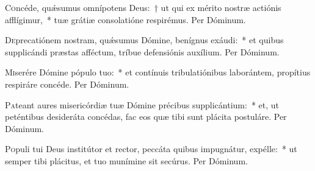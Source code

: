 \documentclass[vesperale_romanum.tex]{subfiles}
\begin{document}

\oratio

\lettrine{C}{o}ncéde, quǽsumus omnípotens Deus:~† ut qui ex mérito nostræ actiónis afflígimur,~* tuæ grátiæ consolatióne respirémus.
Per Dóminum.




\oratio

\lettrine{D}{e}precatiónem nostram, quǽsumus Dómine, benígnus exáudi:~* et quibus supplicándi præstas afféctum, tríbue defensiónis auxílium. Per Dóminum.



\oratio

\lettrine{M}{i}serére Dómine pópulo tuo:~* et contínuis tribulatiónibus laborántem, propítius respiráre concéde. Per Dóminum.



\oratio

\lettrine{P}{a}teant aures misericórdiæ tuæ Dómine précibus supplicántium:~* et, ut peténtibus desideráta concédas, fac eos quæ tibi sunt plácita postuláre.
Per Dóminum.



\oratio

\lettrine{P}{o}puli tui Deus institútor et rector, peccáta quibus impugnátur, expélle:~* ut semper tibi plácitus, et tuo munímine sit secúrus. Per Dóminum.


\end{document}
